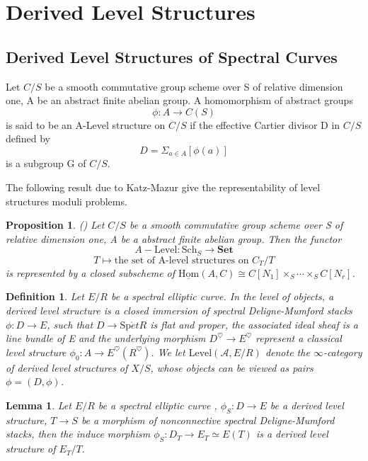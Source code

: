 \documentclass[12pt]{article}
\newtheorem{proposition}[theorem]{Proposition}
\newtheorem{lemma}[theorem]{Lemma}
\theoremstyle{thry}
\newtheorem{definition}[theorem]{Definition}
\def  \Hom      {\mathrm{Hom}}
\def  \Level    {\mathrm{Level}}
\def  \Set      {\mathbf{Set}}
\def  \Spet     {\mathrm{Sp}\acute{e}t}
\def  \Sch      {\mathrm{Sch}}
\def  \ca       {\mathcal{A}}
\begin{document}
\section{Derived Level Structures}
\subsection{Derived Level Structures of Spectral Curves}



	Let $C/S$ be a smooth commutative group scheme over S of relative dimension one, A be an abstract finite abelian group. A homomorphism of abstract groups
$$
\phi: A \to C(S)
$$
is said to be an A-Level structure on $C/S$ if the effective Cartier divisor D in $C/S$  defined by
$$
D= \Sigma_{a \in A} [\phi(a)]
$$
is a  subgroup G of $C/S$.

The following result due to Katz-Mazur \cite{katz1985arithmetic} give the representability of level structures moduli problems.
\begin{proposition}(\cite[Proposition 1.6.2]{katz1985arithmetic})
	Let $C/S$ be a smooth commutative group scheme over S of relative dimension one, A be a abstract finite abelian group. Then the functor
	$$
	A-\Level :  \Sch_S  \to \Set
	$$	
	$$
	T \mapsto \text{the set of A-level structures on $C_T/T$}
	$$
	is  represented by a closed subscheme of $\underline{\Hom}(A,C) \cong C[N_1] \times_S  \cdots  \times_S C[N_r]$.
\end{proposition}



\begin{definition}
Let $E/R$  be a  spectral  elliptic curve. In the level of objects, a derived level structure is a closed immersion of spectral Deligne-Mumford stacks $\phi: D \to E$, such that $D \to \Spet R$ is flat and proper, the associated ideal sheaf is a line bundle of E and the underlying  morphism $D^{\heartsuit} \to E^{\heartsuit}$ represent a classical level structure  $\phi_0: A \to E^{\heartsuit}(R^{\heartsuit})$.  We let $\Level(\ca, E/R)$ denote the $\infty$-category of derived level structures of $X/S$, whose objects can be viewed as pairs $\phi=(D,\phi)$.
\end{definition}

\begin{lemma}
	Let $E/R$ be a spectral elliptic curve  , $\phi_S: D \to E$ be a derived level structure, $T \to S$ be a morphism of nonconnective spectral Deligne-Mumford stacks, then the induce morphism $\phi_S: D_T \to E_T  \simeq E(T)$ is a  derived level structure of $E_T/T$.
\end{lemma}
\end{document}

